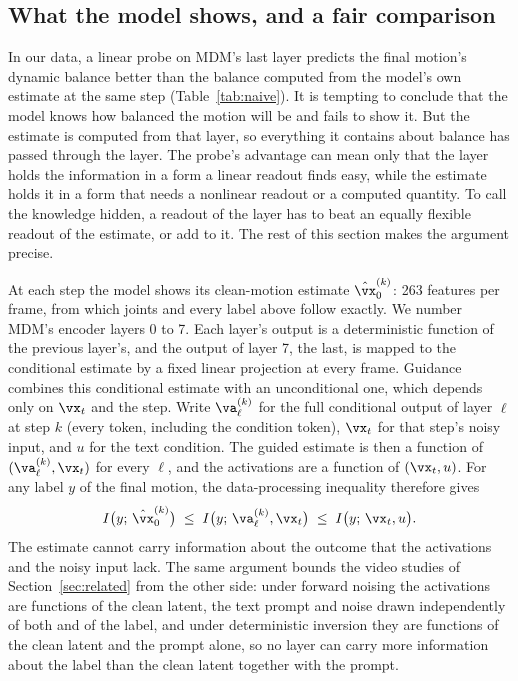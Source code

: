 \subsection{What the model shows, and a fair comparison}
\label{sec:fair}
In our data, a linear probe on MDM's last layer predicts the final motion's dynamic balance better than the balance computed from the model's own estimate at the same step (Table~\ref{tab:naive}). It is tempting to conclude that the model knows how balanced the motion will be and fails to show it. But the estimate is computed from that layer, so everything it contains about balance has passed through the layer. The probe's advantage can mean only that the layer holds the information in a form a linear readout finds easy, while the estimate holds it in a form that needs a nonlinear readout or a computed quantity. To call the knowledge hidden, a readout of the layer has to beat an equally flexible readout of the estimate, or add to it. The rest of this section makes the argument precise.

At each step the model shows its clean-motion estimate $\hat\vx_0^{(k)}$: 263 features per frame, from which joints and every label above follow exactly. We number MDM's encoder layers 0 to 7. Each layer's output is a deterministic function of the previous layer's, and the output of layer 7, the last, is mapped to the conditional estimate by a fixed linear projection at every frame. Guidance combines this conditional estimate with an unconditional one, which depends only on $\vx_t$ and the step. Write $\va_\ell^{(k)}$ for the full conditional output of layer $\ell$ at step $k$ (every token, including the condition token), $\vx_t$ for that step's noisy input, and $u$ for the text condition. The guided estimate is then a function of $(\va_\ell^{(k)}, \vx_t)$ for every $\ell$, and the activations are a function of $(\vx_t, u)$. For any label $y$ of the final motion, the data-processing inequality therefore gives
\begin{equation}
    I\big(y;\, \hat\vx_0^{(k)}\big) \;\le\; I\big(y;\, \va_\ell^{(k)}, \vx_t\big) \;\le\; I\big(y;\, \vx_t, u\big).
\end{equation}
The estimate cannot carry information about the outcome that the activations and the noisy input lack. The same argument bounds the video studies of Section~\ref{sec:related} from the other side: under forward noising the activations are functions of the clean latent, the text prompt and noise drawn independently of both and of the label, and under deterministic inversion they are functions of the clean latent and the prompt alone, so no layer can carry more information about the label than the clean latent together with the prompt.

